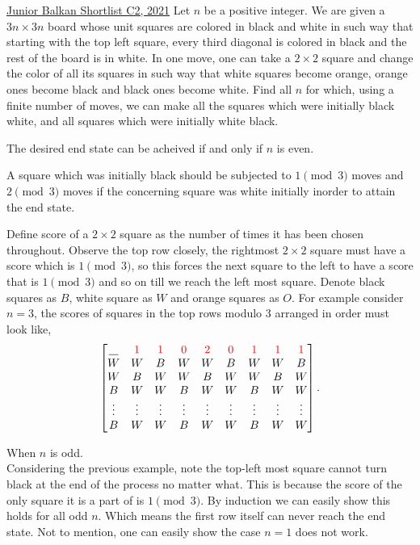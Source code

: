 \begin{problem}{4}{\href{https://artofproblemsolving.com/community/c6h2876405p34326572}{Junior Balkan Shortlist C2, 2021}} 
	Let $n$ be a positive integer. We are given a $3n \times 3n$ board whose unit squares are colored in black and white in such way that starting with the top left square, every third diagonal is colored in black and the rest of the board is in white. In one move, one can take a $2 \times 2$ square and change the color of all its squares in such way that white squares become orange, orange ones become black and black ones become white. Find all $n$ for which, using a finite number of moves, we can make all the squares which were initially black white, and all squares which were initially white black.
	\begin{solution} The desired end state can be acheived if and only if $n$ is even.
		\begin{proposition}{1}A square which was initially black should be subjected to $1\pmod{3}$ moves and $2\pmod{3}$ moves if the concerning square was white initially inorder to attain the end state.
		\end{proposition}
	Define score of a $2\times 2$ square as the number of times it has been chosen throughout. Observe the top row closely, the rightmost $2\times 2$ square must have a score which is $1\pmod {3}$, so this forces the next square to the left to have a score that is $1\pmod{3}$ and so on till we reach the left most square. Denote black squares as $B$, white square as $W$ and orange squares as $O$. For example consider $n=3$, the scores of squares in the top rows modulo $3$ arranged in order must look like,
$$
	\begin{bmatrix}
		\underline{\hspace{0.3cm}} & \textcolor{red}{1} & \textcolor{red}{1} & \textcolor{red}{0} & \textcolor{red}{2} & \textcolor{red}{0} & \textcolor{red}{1} & \textcolor{red}{1} & \textcolor{red}{1}\\
		W & W & B & W & W & B & W & W & B\\
		W & B & W & W & B & W & W & B & W\\
		B & W & W & B & W & W & B & W & W\\
		\vdots & \vdots & \vdots & \vdots & \vdots & \vdots & \vdots & \vdots & \vdots\\
		B & W & W & B & W & W & B & W & W
	\end{bmatrix}.
$$
	\begin{mycases}
	\item When $n$ is odd.\\
Considering the previous example, note the top-left most square cannot turn black at the end of the process no matter what. This is because the score of the only square it is a part of is $1\pmod{3}$. By induction we can easily show this holds for all odd $n$. Which means the first row itself can never reach the end state. Not to mention, one can easily show the case $n=1$ does not work.


\end{mycases}
\end{solution}
\end{problem}
